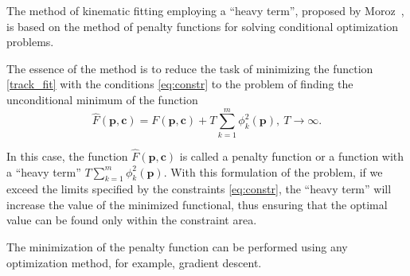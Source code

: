 
%
The method of kinematic fitting employing a ``heavy term'', proposed by Moroz~\cite{b5}, is based on the method of penalty functions for solving conditional optimization problems.

The essence of the method is to reduce the task of minimizing the function \eqref{track_fit} with the conditions \eqref{eq:constr} to the problem of finding the unconditional minimum of the function
\begin{equation}
\hat{F}(\boldsymbol{p}, \boldsymbol{c}) = F(\boldsymbol{p}, \boldsymbol{c}) + T\sum_{k=1}^{m}\phi_k^2(\boldsymbol{p}),~T \rightarrow \infty.
\end{equation}

In this case, the function $\hat{F}(\boldsymbol{p}, \boldsymbol{c})$ is called a penalty function or a function with a ``heavy term'' $\displaystyle T\sum_{k=1}^{m}\phi_k^2(\boldsymbol{p})$.
With this formulation of the problem, if we exceed the limits specified by the constraints \eqref{eq:constr}, the ``heavy term'' will increase the value of the minimized functional, thus ensuring that the optimal value can be found only within the constraint area.

The minimization of the penalty function can be performed using any optimization method, for example, gradient descent.
